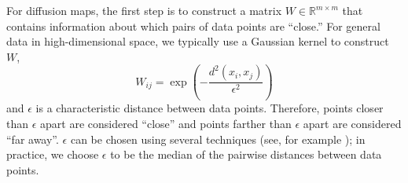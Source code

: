 \documentclass{pnastwo}
\begin{document}
\begin{article}
\begin{materials}

For diffusion maps, the first step is to construct a matrix $W \in \mathbb{R}^{m \times m}$ that contains information about which pairs of data points are ``close.''
%
For general data in high-dimensional space, we typically use a Gaussian kernel to construct $W$,
\begin{equation} \label{eq:dmaps_W}
W_{ij} = \exp \left( -\frac{d^2(x_i, x_j)}{\epsilon^2} \right)
\end{equation}
and $\epsilon$ is a characteristic distance between data points.
%
Therefore, points closer than $\epsilon$ apart are considered ``close'' and points farther than $\epsilon$ apart are considered ``far away''.
%
$\epsilon$ can be chosen using several techniques (see, for example \cite{coifman2008graph}); in practice, we choose $\epsilon$ to be the median of the pairwise distances between data points.


\end{materials}
\end{article}
\end{document}

